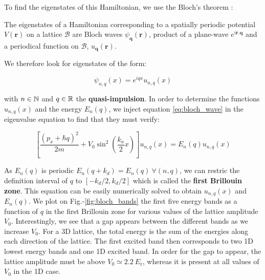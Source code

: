 \noindent To find the eigenstates of this Hamiltonian, we use the Bloch's theorem \cite{ashcroft1976solid}:

\begin{tcolorbox}[colback=red!5!white,colframe=red!75!black,title=\textbf{Bloch's theorem}]
\label{sec:bloch}
The eigenstates of a Hamiltonian corresponding to a spatially periodic potential $V(\bm{r})$ on a lattice $\mathcal{B}$ are Bloch waves $\psi_{\bm{q}}(\bm{r})$, product of a plane-wave $e^{i \bm{r}.\bm{q}}$ and a periodical function on $\mathcal{B}$, $u_{\bm{q}} (\bm{r})$.
\end{tcolorbox}

We therefore look for eigenstates of the form:

\begin{equation}
    \psi_{n,q} (x)= e^{iqx} u_{n,q} (x)
    \label{eq:bloch_wave}
\end{equation}

\noindent with $n \in \mathbb{N}$ and $q \in \mathbb{R}$ the \textbf{quasi-impulsion}. In order to determine the functions $u_{n,q} (x)$ and the energy $E_n (q)$, we inject equation \ref{eq:bloch_wave} in the eigenvalue equation to find that they must verify:

\begin{equation}
    \left[\frac{\left(p_{x}+\hbar q\right)^{2}}{2 m}+V_{0} \sin ^{2}\left(\frac{k_{a}}{2} x\right)\right] u_{n, q}(x)=E_{n}(q) u_{n, q}(x)
\end{equation}

\noindent As $E_n (q)$ is periodic $E_n (q+k_d)= E_n(q) \ \forall (n,q)$, we can restric the definition interval of $q$ to $[-k_d/2, k_d/2]$ which is called the \textbf{first Brillouin zone}. This equation can be easily numerically solved to obtain $u_{n, q}(x)$ and $E_n (q)$. We plot on Fig.-\ref{fig:bloch_bands} the first five energy bands as a function of $q$ in the first Brillouin zone for various values of the lattice amplitude $V_0$. Interestingly, we see that a gap appears between the different bands as we increase $V_0$. For a 3D lattice, the total energy is the sum of the energies along each direction of the lattice. The first excited band then corresponds to two 1D lowest energy bands and one 1D excited band. In order for the gap to appear, the lattice amplitude must be above $V_0 \simeq 2.2 \ E_{\mathrm{r}}$, whereas it is present at all values of $V_0$ in the 1D case.

